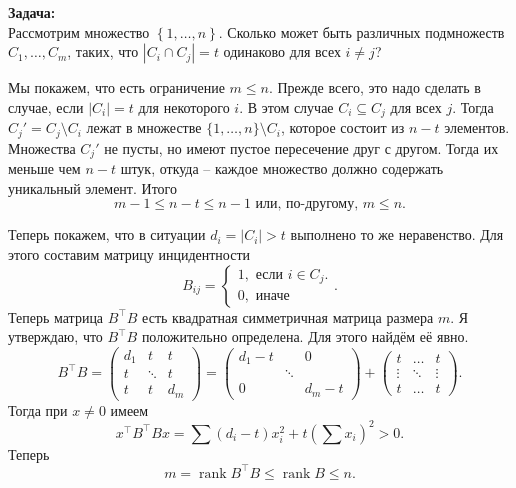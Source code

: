 \documentclass[10pt,a4paper,oneside]{book} %
\theoremstyle{definition}
\newcommand{\rank}{\operatorname{rank}}
\def\pmat{\begin{pmatrix}}
\def\epmat{\end{pmatrix}}
\begin{document}
{\bf Задача:}\\ Рассмотрим множество $\left\{ 1,\dots, n\right\}$. Сколько может быть различных подмножеств $C_1,\dots,C_m$, таких, что $|C_i \cap C_j|=t$ одинаково для всех $i \neq j$?

Мы покажем, что есть ограничение $m\leq n$. Прежде всего, это надо сделать в случае, если $|C_i|=t$ для некоторого $i$. В этом случае $C_i \subseteq C_j$ для всех $j$. Тогда $C_j'=C_j\setminus C_i$ лежат в множестве $\{1,\dots,n\}\setminus C_i$, которое состоит из $n-t$ элементов. Множества $C_j'$ не пусты, но имеют пустое пересечение друг с другом. Тогда их меньше чем $n-t$ штук, откуда -- каждое множество должно содержать уникальный элемент. Итого
$$m-1\leq n-t \leq n-1 \text{ или, по-другому, } m \leq n.$$

Теперь покажем, что в ситуации $d_i=|C_i|>t$ выполнено то же неравенство. Для этого составим матрицу инцидентности
$$B_{ij}= \begin{cases} 1, \text{ если } i\in C_j. \\
0, \text{ иначе}
\end{cases}. $$
Теперь матрица $B^{\top}B$ есть квадратная симметричная матрица размера $m$. Я утверждаю, что $B^{\top}B$ положительно определена. Для этого найдём её явно.
$$B^{\top}B= \pmat
d_1 & t &t\\ 
t & \ddots & t \\
t & t & d_m
\epmat = \pmat
d_1-t &  &0\\ 
 & \ddots &  \\
0 &  & d_m-t
\epmat + \pmat
t & \dots & t\\ 
\vdots & \ddots & \vdots \\
t & \dots & t
\epmat.$$
Тогда при $x\neq 0$ имеем 
$$x^{\top} B^{\top}B x = \sum (d_i-t) x_i^2 + t(\sum x_i)^2>0.$$
Теперь 
$$m=\rank B^{\top}B \leq \rank B \leq n.$$ 
\end{document}
